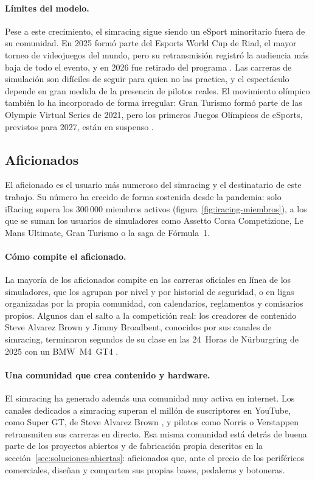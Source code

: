 \paragraph{Límites del modelo.}
Pese a este crecimiento, el simracing sigue siendo un eSport minoritario fuera de su comunidad. En 2025 formó parte del Esports World Cup de Riad, el mayor torneo de videojuegos del mundo, pero su retransmisión registró la audiencia más baja de todo el evento, y en 2026 fue retirado del programa \parencite{traxion_news}. Las carreras de simulación son difíciles de seguir para quien no las practica, y el espectáculo depende en gran medida de la presencia de pilotos reales. El movimiento olímpico también lo ha incorporado de forma irregular: Gran Turismo formó parte de las Olympic Virtual Series de
2021, pero los primeros Juegos Olímpicos de eSports, previstos para 2027, están en suspenso \parencite{granturismo_web, pocketgamer_2025_olympic_esports}.

\subsection{Aficionados}
\label{sec:simracing-aficionados}

El aficionado es el usuario más numeroso del simracing y el destinatario de este trabajo. Su número ha crecido de forma sostenida desde la pandemia: solo iRacing supera los 300\,000 miembros activos \parencite{iracing_news} (figura~\ref{fig:iracing-miembros}), a los que se suman los usuarios de simuladores como Assetto Corsa Competizione, Le Mans Ultimate, Gran Turismo o la saga de Fórmula~1.

\paragraph{Cómo compite el aficionado.}
La mayoría de los aficionados compite en las carreras oficiales en línea de los simuladores, que los agrupan por nivel y por historial de seguridad, o en ligas organizadas por la propia comunidad, con
calendarios, reglamentos y comisarios propios. Algunos dan el salto a la competición real: los creadores de contenido Steve Alvarez Brown y Jimmy Broadbent, conocidos por sus canales de simracing, terminaron segundos de su clase en las 24~Horas de Nürburgring de 2025 con un BMW~M4~GT4 \parencite{blackfalcon_2025_n24}.

\paragraph{Una comunidad que crea contenido y hardware.}
El simracing ha generado además una comunidad muy activa en internet. Los canales dedicados a simracing superan el millón de suscriptores en YouTube, como Super GT, de Steve Alvarez Brown \parencite{alvarezbrown_supergt}, y pilotos como Norris o Verstappen retransmiten sus carreras en directo. Esa misma comunidad está detrás
de buena parte de los proyectos abiertos y de fabricación propia descritos en la sección~\ref{sec:soluciones-abiertas}: aficionados que, ante el precio de los periféricos comerciales, diseñan y comparten sus propias bases, pedaleras y botoneras.

